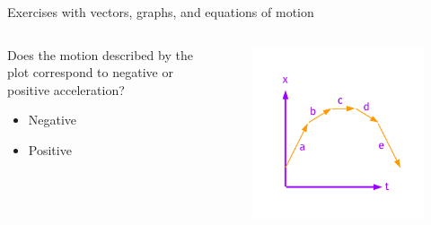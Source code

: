 \documentclass{beamer}
\begin{document}
\begin{frame}{Exercises with vectors, graphs, and equations of motion}
\begin{columns}[T]
\begin{column}{0.4\textwidth}
\small
Does the motion described by the plot correspond to negative or positive acceleration?
\begin{itemize}
\item Negative
\item Positive
\end{itemize}
\end{column}
\begin{column}{0.6\textwidth}
\begin{figure}
\centering
\includegraphics[width=\textwidth,trim=0cm 0cm 0cm 1.5cm,clip=true]{figures/Vectors2.pdf}
\end{figure}
\end{column}
\end{columns}
\end{frame}
\end{document}
